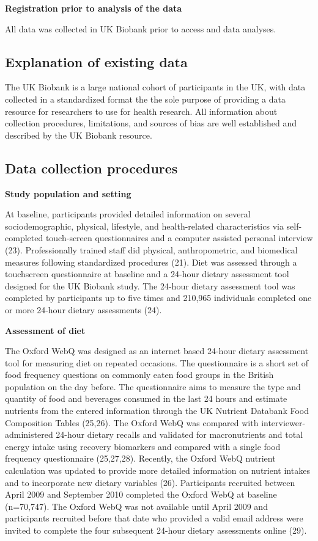 \documentclass[
  11pt,
  a4paper,
  DIV=11,
  numbers=noendperiod,
  twocolumn]{scrartcl}
\begin{document}
\textbf{Registration prior to analysis of the data}

All data was collected in UK Biobank prior to access and data analyses.

\hypertarget{explanation-of-existing-data}{%
\subsection{Explanation of existing
data}\label{explanation-of-existing-data}}

The UK Biobank is a large national cohort of participants in the UK,
with data collected in a standardized format the the sole purpose of
providing a data resource for researchers to use for health research.
All information about collection procedures, limitations, and sources of
bias are well established and described by the UK Biobank resource.

\hypertarget{data-collection-procedures}{%
\subsection{Data collection
procedures}\label{data-collection-procedures}}

\textbf{Study population and setting}

At baseline, participants provided detailed information on several
sociodemographic, physical, lifestyle, and health-related
characteristics via self-completed touch-screen questionnaires and a
computer assisted personal interview (23). Professionally trained staff
did physical, anthropometric, and biomedical measures following
standardized procedures (21). Diet was assessed through a touchscreen
questionnaire at baseline and a 24-hour dietary assessment tool designed
for the UK Biobank study. The 24-hour dietary assessment tool was
completed by participants up to five times and 210,965 individuals
completed one or more 24-hour dietary assessments (24).

\textbf{Assessment of diet}

The Oxford WebQ was designed as an internet based 24-hour dietary
assessment tool for measuring diet on repeated occasions. The
questionnaire is a short set of food frequency questions on commonly
eaten food groups in the British population on the day before. The
questionnaire aims to measure the type and quantity of food and
beverages consumed in the last 24 hours and estimate nutrients from the
entered information through the UK Nutrient Databank Food Composition
Tables (25,26). The Oxford WebQ was compared with
interviewer-administered 24-hour dietary recalls and validated for
macronutrients and total energy intake using recovery biomarkers and
compared with a single food frequency questionnaire (25,27,28).
Recently, the Oxford WebQ nutrient calculation was updated to provide
more detailed information on nutrient intakes and to incorporate new
dietary variables (26). Participants recruited between April 2009 and
September 2010 completed the Oxford WebQ at baseline (n=70,747). The
Oxford WebQ was not available until April 2009 and participants
recruited before that date who provided a valid email address were
invited to complete the four subsequent 24-hour dietary assessments
online (29).
\end{document}
